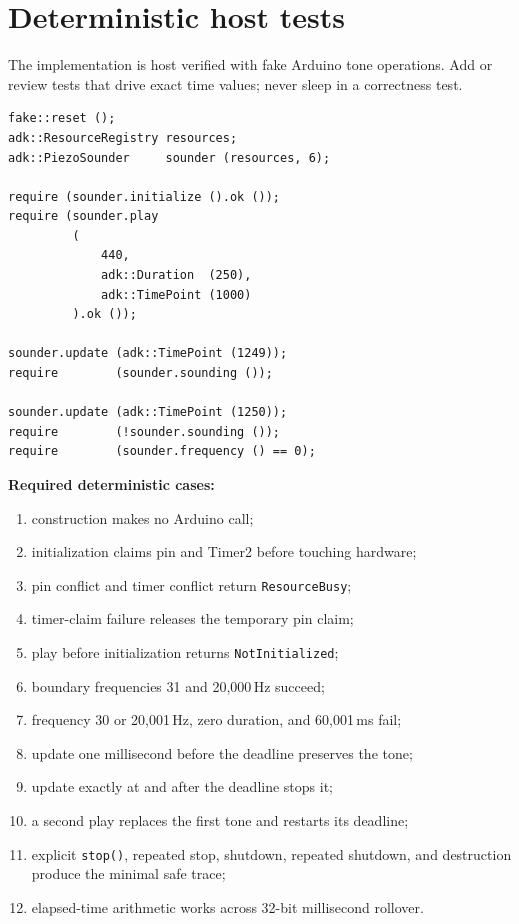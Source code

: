 \documentclass[11pt]{article}
\begin{document}
\section{Deterministic host tests}

The implementation is host verified with fake Arduino tone operations. Add or
review tests that drive exact time values; never sleep in a correctness test.

\begin{lstlisting}[style=adkcpp]
fake::reset ();
adk::ResourceRegistry resources;
adk::PiezoSounder     sounder (resources, 6);

require (sounder.initialize ().ok ());
require (sounder.play
         (
             440,
             adk::Duration  (250),
             adk::TimePoint (1000)
         ).ok ());

sounder.update (adk::TimePoint (1249));
require        (sounder.sounding ());

sounder.update (adk::TimePoint (1250));
require        (!sounder.sounding ());
require        (sounder.frequency () == 0);
\end{lstlisting}

\textbf{Required deterministic cases:}

\begin{enumerate}
    \item construction makes no Arduino call;
    \item initialization claims pin and Timer2 before touching hardware;
    \item pin conflict and timer conflict return \texttt{ResourceBusy};
    \item timer-claim failure releases the temporary pin claim;
    \item play before initialization returns \texttt{NotInitialized};
    \item boundary frequencies 31 and 20,000\,Hz succeed;
    \item frequency 30 or 20,001\,Hz, zero duration, and 60,001\,ms fail;
    \item update one millisecond before the deadline preserves the tone;
    \item update exactly at and after the deadline stops it;
    \item a second play replaces the first tone and restarts its deadline;
    \item explicit \texttt{stop()}, repeated stop, shutdown, repeated shutdown,
          and destruction produce the minimal safe trace;
    \item elapsed-time arithmetic works across 32-bit millisecond rollover.
\end{enumerate}
\end{document}
